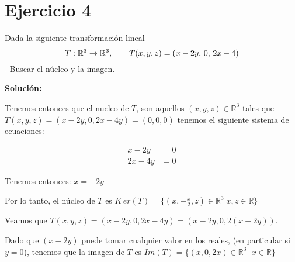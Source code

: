 \section*{Ejercicio 4}

Dada la siguiente transformación lineal
$$ T : \mathbb{R}^{3} \rightarrow \mathbb{R}^{3}, \hspace*{7mm} T(x,y,z) = (x -2y,\, 0,\,2x -4 )$$
\textcolor{white}{.} \hspace{3.3mm} Buscar el núcleo y la imagen.

\vspace{5mm}
\noindent \textbf{Solución:}

Tenemos entonces que el nucleo de $T$, son aquellos $(x,y,z) \in \mathbb{R}^{3}$
tales que $T(x,y,z)= (x - 2y, 0, 2x - 4y) = (0, 0, 0)$ tenemos el siguiente sistema de ecuaciones:

\begin{align*}
     x - 2y & = 0 \\
    2x - 4y & = 0
\end{align*}

\noindent Tenemos entonces: $x = -2y$

\noindent Por lo tanto, el núcleo de $T$ es $K\,er(T)=\{(x, -\frac{x}{2}, z) \in \mathbb{R}^{3} | x, z \in \mathbb{R} \}$

\noindent  Veamos que $T(x, y, z)=(x - 2y, 0, 2x - 4y) = (x - 2y, 0, 2(x - 2y))$.

\noindent  Dado que $(x - 2y)$ puede tomar cualquier valor en los reales, (en particular si $y=0$), 
tenemos que la imagen de $T$ es $Im(T)= \{(x, 0, 2x)  \in \mathbb{R}^{3}\,|\, x \in \mathbb{R}\}$

